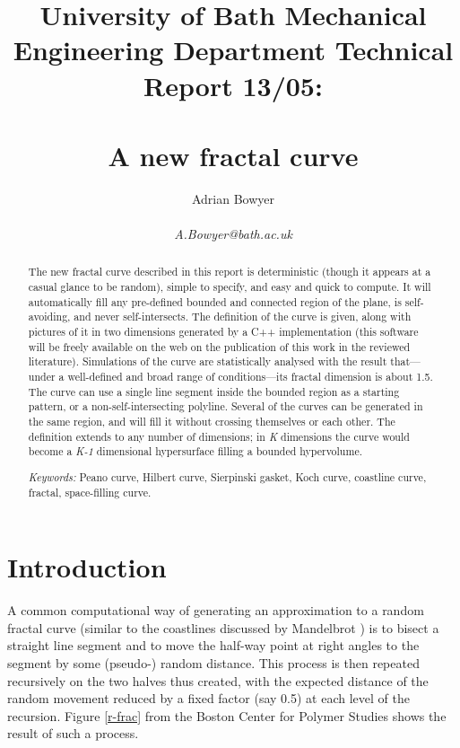 \documentclass[12pt]{article}
\title{{\Large University of Bath Mechanical Engineering Department 
Technical Report 13/05:}\\~\\{\LARGE A new fractal curve}}
\author{Adrian Bowyer\\
\\
{\em A.Bowyer@bath.ac.uk}}
\date{}
\begin{document}
 

 
\maketitle
 
\begin{abstract}

\noindent
The new fractal curve described in this report is deterministic
(though it appears at a casual glance to be random), simple to
specify, and easy and quick to compute.  It will automatically fill
any pre-defined bounded and connected region of the plane, is
self-avoiding, and never self-intersects.  The definition of the curve
is given, along with pictures of it in two dimensions generated by a
C++ implementation (this software will be freely available on the web
on the publication of this work in the reviewed literature).
Simulations of the curve are statistically analysed with the result
that---under a well-defined and broad range of conditions---its
fractal dimension is about 1.5.  The curve can use a single line
segment inside the bounded region as a starting pattern, or a
non-self-intersecting polyline.  Several of the curves can be
generated in the same region, and will fill it without crossing
themselves or each other.  The definition extends to any number of
dimensions; in {\em K} dimensions the curve would become a {\em K-1}
dimensional hypersurface filling a bounded hypervolume.

\vspace{3mm}
                                                             
\noindent
{\em Keywords:} Peano curve, Hilbert curve, Sierpinski gasket, Koch
curve, coastline curve, fractal, space-filling curve.

\end{abstract}

 
\section*{Introduction}

A common computational way of generating an approximation to a random
fractal curve (similar to the coastlines discussed by Mandelbrot
\cite{mandelbrot}) is to bisect a straight line segment and to move
the half-way point at right angles to the segment by some (pseudo-)
random distance.  This process is then repeated recursively on the two
halves thus created, with the expected distance of the random movement
reduced by a fixed factor (say 0.5) at each level of the recursion.
Figure \ref{r-frac} from the Boston Center for Polymer Studies
\cite{boston-cps} shows the result of such a process.
\end{document}
